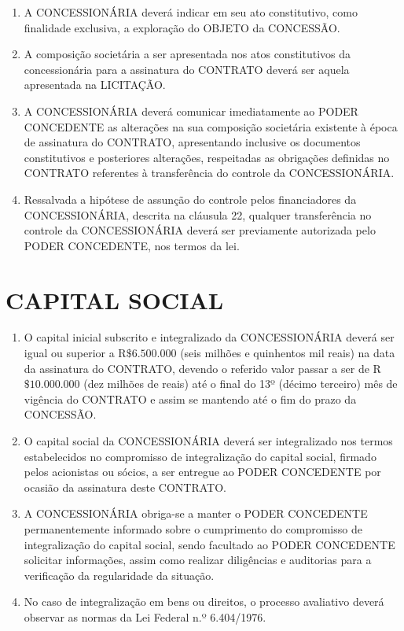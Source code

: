 \documentclass[a4paper,11pt]{report} %
\begin{document}
\begin{enumerate}
\item \label{itm:UHUT} A CONCESSIONÁRIA deverá indicar em seu ato constitutivo, como finalidade exclusiva, a exploração do OBJETO da CONCESSÃO.

\item \label{itm:M4JM} A composição societária a ser apresentada nos atos constitutivos da concessionária para a assinatura do CONTRATO deverá ser aquela apresentada na LICITAÇÃO.

\item \label{itm:X9WN} A CONCESSIONÁRIA deverá comunicar imediatamente ao PODER CONCEDENTE as alterações na sua composição societária existente à época de assinatura do CONTRATO, apresentando inclusive os documentos constitutivos e posteriores alterações, respeitadas as obrigações definidas no CONTRATO referentes à transferência do controle da CONCESSIONÁRIA.

\item \label{itm:M8MD} Ressalvada a hipótese de assunção do controle pelos financiadores da CONCESSIONÁRIA, descrita na cláusula 22, qualquer transferência no controle da CONCESSIONÁRIA deverá ser previamente autorizada pelo PODER CONCEDENTE, nos termos da lei. 
\end{enumerate}

\section{CAPITAL SOCIAL}
\label{sec:9BB2}

\begin{enumerate}
\item \label{itm:T56F} O capital inicial subscrito e integralizado da CONCESSIONÁRIA deverá ser igual ou superior a R$\$ 6.500.000$ (seis milhões e quinhentos mil reais) na data da assinatura do CONTRATO, devendo o referido valor passar a ser de R$\$ 10.000.000$ (dez milhões de reais) até o final do 13º (décimo terceiro) mês de vigência do CONTRATO e assim se mantendo até o fim do prazo da CONCESSÃO. 

\item \label{itm:F9PT} O capital social da CONCESSIONÁRIA deverá ser integralizado nos termos estabelecidos no compromisso de integralização do capital social, firmado pelos acionistas ou sócios, a ser entregue ao PODER CONCEDENTE por ocasião da assinatura deste CONTRATO. 

\item \label{itm:HYUD} A CONCESSIONÁRIA obriga-se a manter o PODER CONCEDENTE permanentemente informado sobre o cumprimento do compromisso de integralização do capital social, sendo facultado ao PODER CONCEDENTE solicitar informações, assim como realizar diligências e auditorias para a verificação da regularidade da situação. 

\item \label{itm:N5YT} No caso de integralização em bens ou direitos, o processo avaliativo deverá observar as normas da Lei Federal n.º 6.404/1976. 
\end{enumerate}
\end{document}
